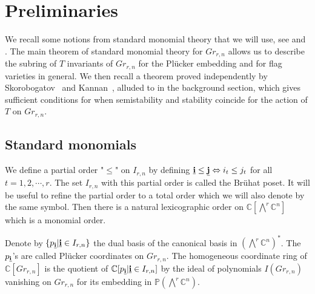 \section{Preliminaries}
 
We recall some notions from standard monomial theory that we will use, see \cite{seshadriintroduction} and \cite{lakshmibai2007standard}. The main theorem of standard monomial theory for $Gr_{r,n}$ allows us to describe the subring of $T$ invariants of $Gr_{r,n}$ for the Pl\"{u}cker embedding and for flag varieties in general. We then recall a theorem proved independently by Skorobogatov~\cite{skorobogatov1993swinnerton} and Kannan~\cite{kannan1998torus}, alluded to in the background section, which gives sufficient conditions for when semistability and stability coincide for the action of $T$ on $Gr_{r,n}$.
  
\subsection{Standard monomials}
 \label{sec:std:monom}
 We define a partial order "$\leq$" on $I_{r,n}$ by defining $ {\bf \underline{i}} \leq {\bf \underline{j}} \Leftrightarrow i_t \leq j_t$ for all $t = 1,2,\cdots,r$. The set $I_{r,n}$ with this partial order is called the Br\"{u}hat poset.  It will be useful to refine the partial order to a total order which we will also denote by the same symbol. Then there is a natural lexicographic order on ${\mathbb C}[\bigwedge^r {\mathbb C}^n]$ which is a 
 monomial order.
 
Denote by $\{p_{\bf \underline{i}} | {\bf \underline{i}} \in I_{r,n}\}$ the dual basis of the canonical basis in  $(\bigwedge^r{\mathbb C}^n)^*$. The $p_{\bf \underline{i}}$'s are called Pl\"{u}cker coordinates on $Gr_{r,n}$. The homogeneous coordinate ring of ${\mathbb C}[Gr_{r,n}]$ is the quotient of ${\mathbb C}[p_{\bf \underline{i}} | {\bf \underline{i}} \in I_{r,n}]$ by the ideal of polynomials $I(Gr_{r,n})$ vanishing on $Gr_{r,n}$ for its embedding in ${\mathbb P}(\bigwedge^r{\mathbb C}^n)$.  
  
